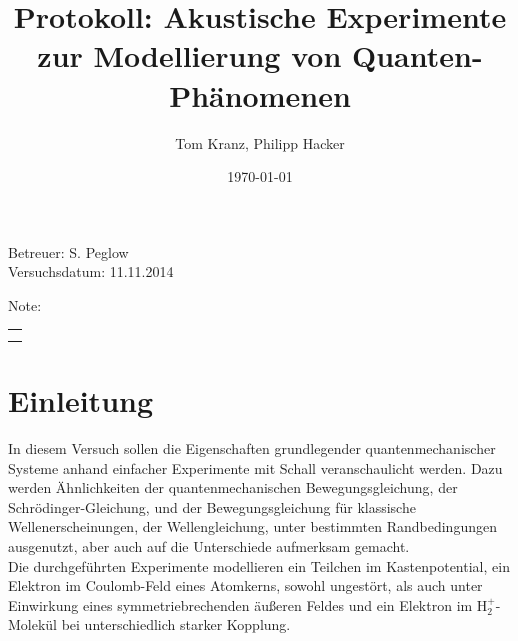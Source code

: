 \documentclass[numbers=noenddot,12pt,a4paper]{scrartcl}
\title{Protokoll: Akustische Experimente zur Modellierung von Quanten-Phänomenen}
\author{Tom Kranz, Philipp Hacker}
\date{\today}
\begin{document}
\maketitle
\begin{center}
Betreuer: S. Peglow\\
Versuchsdatum: 11.11.2014\\
\begin{table}[h]
\centering
Note: %
\begin{tabularx}{1.5cm}{|X|}
\hline \\ \\
\hline
\end{tabularx}
\end{table}
\end{center}
\vspace*{\fill}
\tableofcontents
\vfill
\newpage
\section{Einleitung}
In diesem Versuch sollen die Eigenschaften grundlegender quantenmechanischer Systeme anhand einfacher Experimente mit Schall veranschaulicht werden. Dazu werden Ähnlichkeiten der quantenmechanischen Bewegungsgleichung, der Schrödinger-Gleichung, und der Bewegungsgleichung für klassische Wellenerscheinungen, der Wellengleichung, unter bestimmten Randbedingungen ausgenutzt, aber auch auf die Unterschiede aufmerksam gemacht.\\
Die durchgeführten Experimente modellieren ein Teilchen im Kastenpotential, ein Elektron im Coulomb-Feld eines Atomkerns, sowohl ungestört, als auch unter Einwirkung eines symmetriebrechenden äußeren Feldes und ein Elektron im $\text{H}_2^+$-Molekül bei unterschiedlich starker Kopplung.
\end{document}
